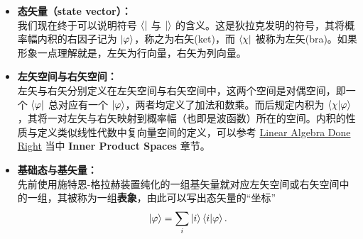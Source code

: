 \documentclass[12pt,a4paper,oneside]{book}
\begin{document}
\begin{itemize}
    \item \textbf{态矢量（state vector）：}\\    我们现在终于可以说明符号 $\bra{}$ 与 $\ket{}$ 的含义。这是狄拉克发明的符号，其将概率幅内积的右因子记为 $\ket{\varphi}$，称之为右矢(ket)，而 $\bra{\chi}$ 被称为左矢(bra)。如果形象一点理解就是，左矢为行向量，右矢为列向量。
    \item \textbf{左矢空间与右矢空间：}\\左矢与右矢分别定义在左矢空间与右矢空间中，这两个空间是对偶空间，即一个 $\bra{\varphi}$ 总对应有一个 $\ket{\varphi}$，两者均定义了加法和数乘。而后规定内积为 $\braket{\chi}{\varphi}$，其将一对左矢与右矢映射到概率幅（也即是波函数）所在的空间。内积的性质与定义类似线性代数中复向量空间的定义，可以参考 \href{https://linear.axler.net/LADR4e.pdf}{Linear Algebra Done Right} 当中 \textbf{Inner Product Spaces} 章节。
    \item \textbf{基础态与基矢量：}\\先前使用施特恩-格拉赫装置纯化的一组基矢量就对应左矢空间或右矢空间中的一组，其被称为一组\textbf{表象}，由此可以写出态矢量的“坐标”
    \begin{equation}
        \ket{\varphi}=\sum_i \ket{i}\braket{i}{\varphi}.
    \end{equation}
\end{itemize}
\end{document}
